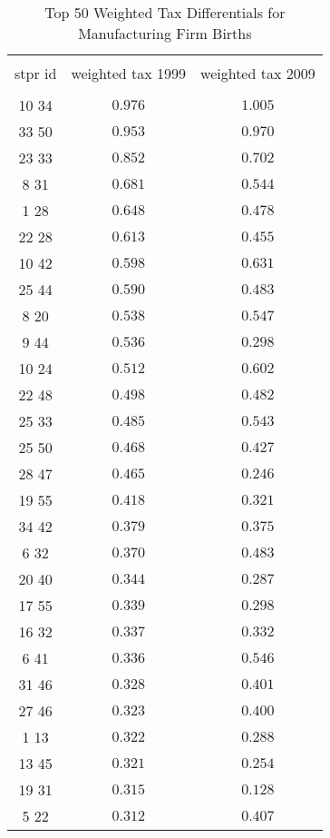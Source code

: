 
\begin{table}[!htbp] \centering 
  \caption{Top 50 Weighted Tax Differentials for  Manufacturing Firm Births} 
  \label{} 
\tiny 
\begin{tabular}{@{\extracolsep{5pt}} ccc} 
\\[-1.8ex]\hline 
\hline \\[-1.8ex] 
stpr id & weighted tax 1999 & weighted tax 2009 \\ 
\hline \\[-1.8ex] 
10 34  & $0.976$ & $1.005$ \\ 
33 50  & $0.953$ & $0.970$ \\ 
23 33  & $0.852$ & $0.702$ \\ 
8 31  & $0.681$ & $0.544$ \\ 
1 28  & $0.648$ & $0.478$ \\ 
22 28  & $0.613$ & $0.455$ \\ 
10 42  & $0.598$ & $0.631$ \\ 
25 44  & $0.590$ & $0.483$ \\ 
8 20  & $0.538$ & $0.547$ \\ 
9 44  & $0.536$ & $0.298$ \\ 
10 24  & $0.512$ & $0.602$ \\ 
22 48  & $0.498$ & $0.482$ \\ 
25 33  & $0.485$ & $0.543$ \\ 
25 50  & $0.468$ & $0.427$ \\ 
28 47  & $0.465$ & $0.246$ \\ 
19 55  & $0.418$ & $0.321$ \\ 
34 42  & $0.379$ & $0.375$ \\ 
6 32  & $0.370$ & $0.483$ \\ 
20 40  & $0.344$ & $0.287$ \\ 
17 55  & $0.339$ & $0.298$ \\ 
16 32  & $0.337$ & $0.332$ \\ 
6 41  & $0.336$ & $0.546$ \\ 
31 46  & $0.328$ & $0.401$ \\ 
27 46  & $0.323$ & $0.400$ \\ 
1 13  & $0.322$ & $0.288$ \\ 
13 45  & $0.321$ & $0.254$ \\ 
19 31  & $0.315$ & $0.128$ \\ 
5 22  & $0.312$ & $0.407$ \\ 

\end{tabular}
\end{table}
